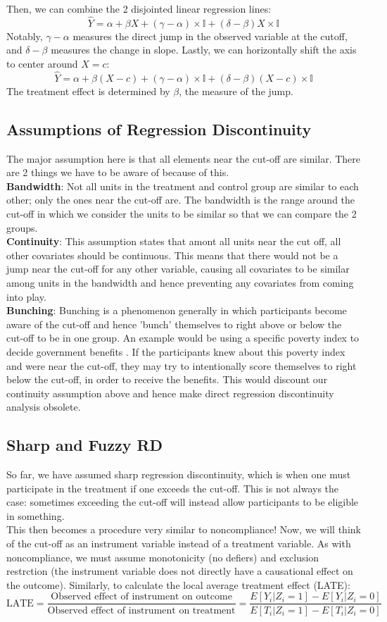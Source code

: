 \documentclass{article}
\begin{document}
Then, we can combine the 2 disjointed linear regression lines:
$$\hat{Y} = \alpha + \beta X + (\gamma - \alpha) \times \mathbb{I} + (\delta - \beta) X \times \mathbb{I}$$
Notably, $\gamma - \alpha$ measures the direct jump in the observed variable at the cutoff, and $\delta - \beta$ measures the change in slope.
Lastly, we can horizontally shift the axis to center around $X=c$:
$$\hat{Y} = \alpha + \beta (X-c) + (\gamma - \alpha) \times \mathbb{I} + (\delta - \beta) (X-c) \times \mathbb{I}$$
The treatment effect is determined by $\beta$, the measure of the jump.


\subsection{Assumptions of Regression Discontinuity}
The major assumption here is that all elements near the cut-off are similar.
There are 2 things we have to be aware of because of this.
\\
\textbf{Bandwidth}: Not all units in the treatment and control group are similar to each other; only the ones near the cut-off are. 
The bandwidth is the range around the cut-off in which we consider the units to be similar so that we can compare the 2 groups.
\\
\textbf{Continuity}: This assumption states that amont all units near the cut off, all other covariates should be continuous.
This means that there would not be a jump near the cut-off for any other variable, causing all covariates to be similar among units in the bandwidth and hence preventing any covariates from coming into play. 
\\
\textbf{Bunching}: Bunching is a phenomenon generally in which participants become aware of the cut-off and hence 'bunch' themselves to right above or below the cut-off to be in one group.
An example would be using a specific poverty index to decide government benefits .
If the participants knew about this poverty index and were near the cut-off, they may try to intentionally score themselves to right below the cut-off, in order to receive the benefits.
This would discount our continuity assumption above and hence make direct regression discontinuity analysis obsolete.

\subsection{Sharp and Fuzzy RD}
So far, we have assumed sharp regression discontinuity, which is when one must participate in the treatment if one exceeds the cut-off.
This is not always the case: sometimes exceeding the cut-off will instead allow participants to be eligible in something. 
\\
This then becomes a procedure very similar to noncompliance!
Now, we will think of the cut-off as an instrument variable instead of a treatment variable.
As with noncompliance, we must assume monotonicity (no defiers) and exclusion restrction (the instrument variable does not directly have a causational effect on the outcome).
Similarly, to calculate the local average treatment effect (LATE):
$$\textrm{LATE} = \frac{\textrm{Observed effect of instrument on outcome}}{\textrm{Observed effect of instrument on treatment}} = \frac{E[Y_i|Z_i=1]-E[Y_i|Z_i=0]}{E[T_i|Z_i=1]-E[T_i|Z_i=0]}$$
\end{document}
